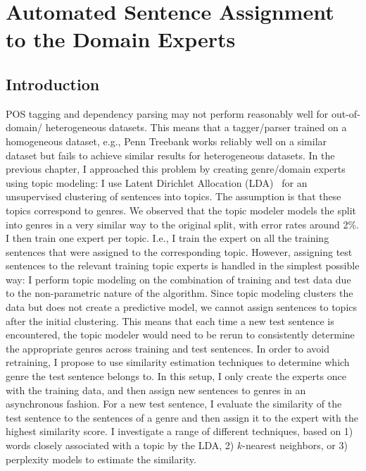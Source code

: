 \chapter{Automated Sentence Assignment to the Domain Experts}


\section{Introduction}

POS tagging and dependency parsing may not perform reasonably well for out-of-domain/ heterogeneous datasets. This means that a tagger/parser trained on a homogeneous dataset, e.g., Penn Treebank works reliably well on a similar dataset but fails to achieve similar results for heterogeneous datasets. In the previous chapter, I approached this problem by creating genre/domain experts using topic modeling: I use Latent Dirichlet Allocation (LDA)~\citep{Blei:2003:LDA:944919.944937,Blei:2012:PTM:2133806.2133826} for an unsupervised clustering of  sentences into topics. The assumption is that these topics correspond to genres. We observed that the topic modeler models the split into genres in a very similar way to the original split, with error rates around 2\%. I then train one expert per topic. I.e., I train the expert on all the training sentences that were assigned to the corresponding topic. 
However, assigning test sentences to the relevant training topic experts is handled in the simplest possible way: I perform topic modeling on the combination of training and test data due to the non-parametric nature of the algorithm. Since topic modeling clusters the data but does not create a predictive model, we cannot assign sentences to topics after the initial clustering. 
This means that each time a new test sentence is encountered, the topic modeler would need to be rerun to consistently determine the appropriate genres across training and test sentences. In order to avoid retraining, I propose to use similarity estimation techniques to determine which genre the test sentence belongs to. In this setup, I only create the experts once with the training data, and then assign new sentences to genres in an asynchronous fashion. 
For a new test sentence, I evaluate the similarity of the test sentence to the sentences of a genre and then assign it to the expert with the highest similarity score. I investigate a range of different techniques, based on 1) words closely associated with a topic by the LDA, 2) $k$-nearest neighbors, or 3) perplexity models to estimate the similarity. 

